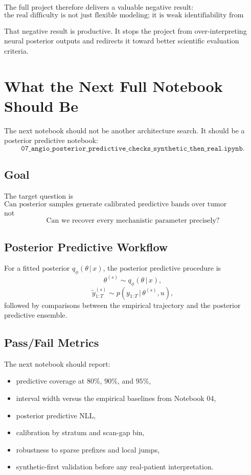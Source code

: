 \documentclass[11pt,a4paper]{article}
\newcommand{\given}{\,|\,}
\begin{document}
The full project therefore delivers a valuable negative result:
\[
\boxed{
\text{the real difficulty is not just flexible modeling; it is weak identifiability from sparse tumor trajectories}
}
\]

That negative result is productive. It stops the project from over-interpreting neural posterior outputs and redirects it toward better scientific evaluation criteria.

\section{What the Next Full Notebook Should Be}

The next notebook should not be another architecture search. It should be a posterior predictive notebook:
\[
    \texttt{07\_angio\_posterior\_predictive\_checks\_synthetic\_then\_real.ipynb}.
\]

\subsection{Goal}

The target question is
\[
    \text{Can posterior samples generate calibrated predictive bands over tumor trajectories?}
\]
not
\[
    \text{Can we recover every mechanistic parameter precisely?}
\]

\subsection{Posterior Predictive Workflow}

For a fitted posterior $q_\phi(\theta\given x)$, the posterior predictive procedure is
\[
    \theta^{(s)}\sim q_\phi(\theta\given x),
\]
\[
    \widetilde y^{(s)}_{1:T}\sim p(y_{1:T}\given \theta^{(s)},u),
\]
followed by comparisons between the empirical trajectory and the posterior predictive ensemble.

\subsection{Pass/Fail Metrics}

The next notebook should report:
\begin{itemize}[leftmargin=2em]
    \item predictive coverage at $80\%$, $90\%$, and $95\%$,
    \item interval width versus the empirical baselines from Notebook 04,
    \item posterior predictive NLL,
    \item calibration by stratum and scan-gap bin,
    \item robustness to sparse prefixes and local jumps,
    \item synthetic-first validation before any real-patient interpretation.
\end{itemize}
\end{document}
